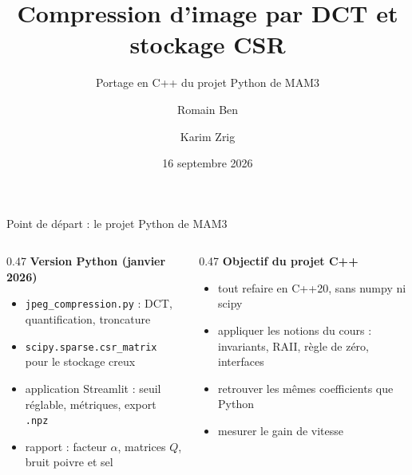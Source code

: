 \documentclass[aspectratio=169,10pt]{beamer}
\title{Compression d'image par DCT et stockage CSR}
\subtitle{Portage en C++ du projet Python de MAM3}
\author{Romain Ben \and Karim Zrig}
\institute{MAM4 Polytech Nice Sophia \quad|\quad Projet C++}
\date{16 septembre 2026}
\newcommand{\code}[1]{\texttt{#1}}
\begin{document}
\begin{frame}
  \titlepage
\end{frame}

\begin{frame}{Point de départ : le projet Python de MAM3}
  \begin{columns}[T]
    \begin{column}{0.47\textwidth}
      \textbf{Version Python (janvier 2026)}
      \begin{itemize}
        \item \code{jpeg\_compression.py} : DCT, quantification, troncature
        \item \code{scipy.sparse.csr\_matrix} pour le stockage creux
        \item application Streamlit : seuil réglable, métriques, export \code{.npz}
        \item rapport : facteur $\alpha$, matrices $Q$, bruit poivre et sel
      \end{itemize}
    \end{column}
    \begin{column}{0.47\textwidth}
      \textbf{Objectif du projet C++}
      \begin{itemize}
        \item tout refaire en C++20, sans numpy ni scipy
        \item appliquer les notions du cours : invariants, RAII, règle de zéro, interfaces
        \item retrouver les mêmes coefficients que Python
        \item mesurer le gain de vitesse
      \end{itemize}
    \end{column}
  \end{columns}
\end{frame}
\end{document}
